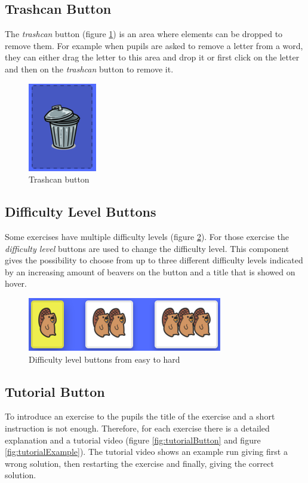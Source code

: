 \subsection*{Trashcan Button}
The \textit{trashcan} button (figure \ref{fig:trashcan}) is an area where elements can be dropped to remove them. For example when pupils are asked to remove a letter from a word, they can either drag the letter to this area and drop it or first click on the letter and then on the \textit{trashcan} button to remove it.

\begin{figure}[h]
    \centering
    \includegraphics[width=0.1\columnwidth]{figures/trashcan.png}
    \caption{Trashcan button}
    \label{fig:trashcan} 
\end{figure}

\subsection*{Difficulty Level Buttons}
Some exercises have multiple difficulty levels (figure \ref{fig:difficultyLevels}). For those exercise the \textit{difficulty level} buttons are used to change the difficulty level. This component gives the possibility to choose from up to three different difficulty levels indicated by an increasing amount of beavers on the button and a title that is showed on hover.

\begin{figure}[h]
    \centering
    \includegraphics[width=0.5\columnwidth]{figures/difficulty_level.png}
    \caption{Difficulty level buttons from easy to hard}
    \label{fig:difficultyLevels} 
\end{figure}

\subsection*{Tutorial Button}
To introduce an exercise to the pupils the title of the exercise and a short instruction is not enough. Therefore, for each exercise there is a detailed explanation and a tutorial video (figure \ref{fig:tutorialButton} and figure \ref{fig:tutorialExample}). The tutorial video shows an example run giving first a wrong solution, then restarting the exercise and finally, giving the correct solution.

